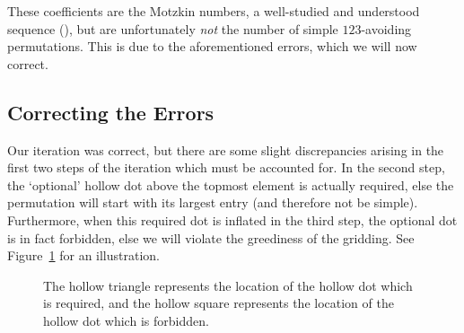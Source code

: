 \documentclass[12pt,twoside]{memoir}
\begin{document}
      These coefficients are the Motzkin numbers, a well-studied and understood
      sequence (), but are unfortunately \emph{not} the number of
      simple $123$-avoiding permutations.  This is due to the aforementioned
      errors, which we will now correct. 
      
      
    \subsection{Correcting the Errors}
    \label{involutions:sub:errors}

      Our iteration was correct, but there are some slight discrepancies arising
      in the first two steps of the iteration which must be accounted for. In the
      second step, the `optional' hollow dot above the topmost element is
      actually required, else the permutation will start with its largest entry
      (and therefore not be simple). Furthermore, when this required dot is
      inflated in the third step, the optional dot is in fact forbidden, else we
      will violate the greediness of the gridding. See
      Figure~\ref{involutions:fig:errors} for an illustration. 
      
      

      \begin{figure}[t] \centering
          \hspace{2pc} 
        \caption[The hollow triangle represents the location of the hollow dot
                  which is required]{
            The hollow triangle represents the location of the hollow dot
            which is required, and the hollow square represents the location of
            the hollow dot which is forbidden.}
      \label{involutions:fig:errors}
      \end{figure}
    
\end{document}
